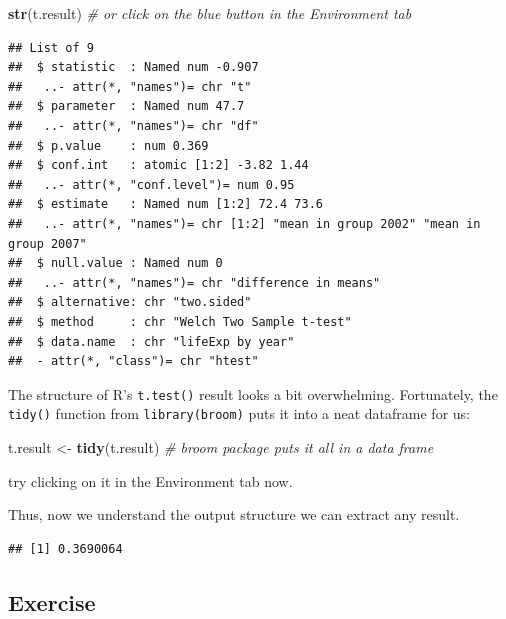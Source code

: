 \documentclass[]{book}
\makeatletter
\newenvironment{Shaded}{\begin{snugshade}}{\end{snugshade}}
\newcommand{\KeywordTok}[1]{\textcolor[rgb]{0.13,0.29,0.53}{\textbf{#1}}}
\newcommand{\StringTok}[1]{\textcolor[rgb]{0.31,0.60,0.02}{#1}}
\newcommand{\CommentTok}[1]{\textcolor[rgb]{0.56,0.35,0.01}{\textit{#1}}}
\newcommand{\OperatorTok}[1]{\textcolor[rgb]{0.81,0.36,0.00}{\textbf{#1}}}
\newcommand{\NormalTok}[1]{#1}
\newenvironment{kframe}{%
\medskip{}
\setlength{\fboxsep}{.8em}
 \def\at@end@of@kframe{}%
 \ifinner\ifhmode%
  \def\at@end@of@kframe{\end{minipage}}%
  \begin{minipage}{\columnwidth}%
 \fi\fi%
 \def\FrameCommand##1{\hskip\@totalleftmargin \hskip-\fboxsep
 \colorbox{shadecolor}{##1}\hskip-\fboxsep
     \hskip-\linewidth \hskip-\@totalleftmargin \hskip\columnwidth}%
 \MakeFramed {\advance\hsize-\width
   \@totalleftmargin\z@ \linewidth\hsize
   \@setminipage}}%
 {\par\unskip\endMakeFramed%
 \at@end@of@kframe}
\renewenvironment{Shaded}{\begin{kframe}}{\end{kframe}}
\makeatother
\begin{document}
\begin{Shaded}
\begin{Highlighting}[]
\KeywordTok{str}\NormalTok{(t.result) }\CommentTok{# or click on the blue button in the Environment tab}
\end{Highlighting}
\end{Shaded}

\begin{verbatim}
## List of 9
##  $ statistic  : Named num -0.907
##   ..- attr(*, "names")= chr "t"
##  $ parameter  : Named num 47.7
##   ..- attr(*, "names")= chr "df"
##  $ p.value    : num 0.369
##  $ conf.int   : atomic [1:2] -3.82 1.44
##   ..- attr(*, "conf.level")= num 0.95
##  $ estimate   : Named num [1:2] 72.4 73.6
##   ..- attr(*, "names")= chr [1:2] "mean in group 2002" "mean in group 2007"
##  $ null.value : Named num 0
##   ..- attr(*, "names")= chr "difference in means"
##  $ alternative: chr "two.sided"
##  $ method     : chr "Welch Two Sample t-test"
##  $ data.name  : chr "lifeExp by year"
##  - attr(*, "class")= chr "htest"
\end{verbatim}

The structure of R's \texttt{t.test()} result looks a bit overwhelming.
Fortunately, the \texttt{tidy()} function from \texttt{library(broom)}
puts it into a neat dataframe for us:

\begin{Shaded}
\begin{Highlighting}[]
\NormalTok{t.result <-}\StringTok{ }\KeywordTok{tidy}\NormalTok{(t.result) }\CommentTok{# broom package puts it all in a data frame}
\end{Highlighting}
\end{Shaded}

try clicking on it in the Environment tab now.

Thus, now we understand the output structure we can extract any result.

\begin{Shaded}
\end{Shaded}

\begin{verbatim}
## [1] 0.3690064
\end{verbatim}

\subsection{Exercise}\label{exercise-31}
\end{document}
